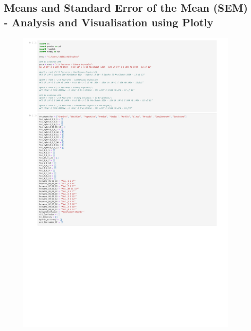 \subsection{Means and Standard Error of the Mean (SEM) - Analysis and Visualisation using Plotly}
\begin{figure}[H]
  \centering
    \includegraphics[width=0.99\textwidth, height=0.99\textheight]{Code/Mean_and_SEM_-_Visualisation_of_12_of_12_Validation_Sets.pdf}
  \label{fig:Mean_and_SEM_-_Visualisation_of_12_of_12_Validation_Sets}
\end{figure}

